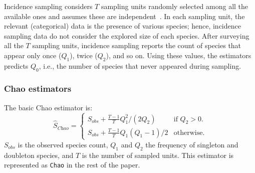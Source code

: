 \documentclass[sigconf,review,anonymous]{acmart}
\newcommand{\Chao}{Chao\xspace}
\newcommand{\chao}{$\hat{S}_\textit{Chao}$\xspace}
\def\<#1>{\texttt{#1}}
\begin{document}

%
Incidence sampling considers $T$ sampling units randomly selected among all
the available ones and assumes these are independent~\cite{chao2016species}.
%
In each sampling unit, the relevant (categorical) data is the presence of various species;
hence, incidence sampling data do not consider the explored size of each species.
%
After surveying all the $T$ sampling units, incidence sampling reports the count of species
that appear only once ($Q_1$), twice ($Q_2$), and so on. %
%
Using these values, the estimators predicts $Q_0$, i.e., the number of species that never
appeared during sampling.

\subsubsection{Chao estimators~\cite{chao1984nonparametric}}
The basic \Chao estimator
is: %
\begin{displaymath}
\text{\chao}=\begin{cases}
    S_{\textit{obs}} + \frac{T-1}{T} Q_1^2/(2Q_2) & \text{if $Q_2>0$}.\\
    S_{\textit{obs}} + \frac{T-1}{T} Q_1(Q_1-1)/2 & \text{otherwise}.
  \end{cases}
\end{displaymath}
$S_{\textit{obs}}$ is the observed species count,
$Q_1$ and $Q_2$ the frequency of singleton and doubleton species,
and $T$ is the number of sampled units.
This estimator is represented as \<\Chao>
in the rest of the paper.
\end{document}
